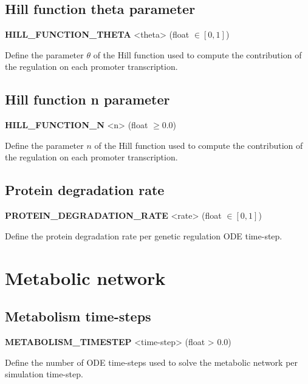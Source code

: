 
\subsection{Hill function theta parameter}
\begin{center}
{\bf HILL\_FUNCTION\_THETA} <theta> (float $\in [0, 1]$)
\end{center}
Define the parameter $\theta$ of the Hill function used to compute the contribution of the regulation on each promoter transcription.


\subsection{Hill function n parameter}
\begin{center}
{\bf HILL\_FUNCTION\_N} <n> (float $\ge 0.0$)
\end{center}
Define the parameter $n$ of the Hill function used to compute the contribution of the regulation on each promoter transcription.


\subsection{Protein degradation rate}
\begin{center}
{\bf PROTEIN\_DEGRADATION\_RATE} <rate> (float $\in [0, 1]$)
\end{center}
Define the protein degradation rate per genetic regulation ODE time-step.


\section{Metabolic network}

\subsection{Metabolism time-steps}
\begin{center}
{\bf METABOLISM\_TIMESTEP} <time-step> (float > 0.0)
\end{center}
Define the number of ODE time-steps used to solve the metabolic network per simulation time-step.

